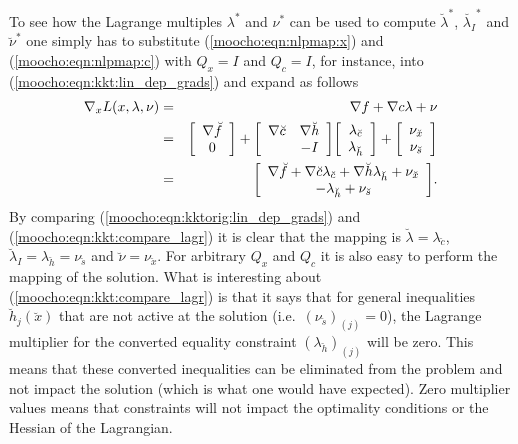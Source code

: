 \documentclass[pdf,12pt,report]{SANDreport}
\begin{document}
To see how the Lagrange multiples $\lambda^*$ and $\nu^*$ can be used to
compute $\breve{\lambda}^*$, $\breve{\lambda_I}^*$ and $\breve{\nu}^*$ one
simply has to substitute (\ref{moocho:eqn:nlpmap:x}) and
(\ref{moocho:eqn:nlpmap:c}) with $Q_x = I$ and $Q_c = I$, for instance, into
(\ref{moocho:eqn:kkt:lin_dep_grads}) and expand as follows
%
\begin{eqnarray}
\nabla_{x} L(x,\lambda,\nu)
 & = & \nabla f + \nabla c \lambda + \nu \nonumber \\
 & = & {\bmat{c} \nabla \breve{f} \\ 0 \emat}
     + {\bmat{cc} \nabla \breve{c} & \nabla \breve{h} \\ & -I \emat}
       {\bmat{c} \lambda_{\breve{c}} \\ \lambda_{\breve{h}} \emat}
     + {\bmat{c} \nu_{\breve{x}} \\ \nu_{\breve{s}} \emat}
	\nonumber \\
 & = & {\bmat{c}
	\nabla \breve{f} + \nabla \breve{c} \lambda_{\breve{c}} + \nabla \breve{h} \lambda_{\breve{h}} + \nu_{\breve{x}} \\
	-\lambda_{\breve{h}} + \nu_{\breve{s}}
	\emat}.
	\label{moocho:eqn:kkt:compare_lagr}
\end{eqnarray}
%
By comparing (\ref{moocho:eqn:kktorig:lin_dep_grads}) and
(\ref{moocho:eqn:kkt:compare_lagr}) it is clear that the mapping is
$\breve{\lambda} = \lambda_{\breve{c}}$, $\breve{\lambda}_I =
\lambda_{\breve{h}} = \nu_{\breve{s}}$ and $\breve{\nu} = \nu_{\breve{x}}$.
For arbitrary $Q_x$ and $Q_c$ it is also easy to perform the mapping of the
solution.  What is interesting about (\ref{moocho:eqn:kkt:compare_lagr}) is
that it says that for general inequalities $\breve{h}_j(\breve{x})$ that are
not active at the solution (i.e.\ $(\nu_{\breve{s}})_{(j)} = 0$), the Lagrange
multiplier for the converted equality constraint $(\lambda_{\breve{h}})_{(j)}$
will be zero.  This means that these converted inequalities can be eliminated
from the problem and not impact the solution (which is what one would have
expected).  Zero multiplier values means that constraints will not impact the
optimality conditions or the Hessian of the Lagrangian.
\end{document}
